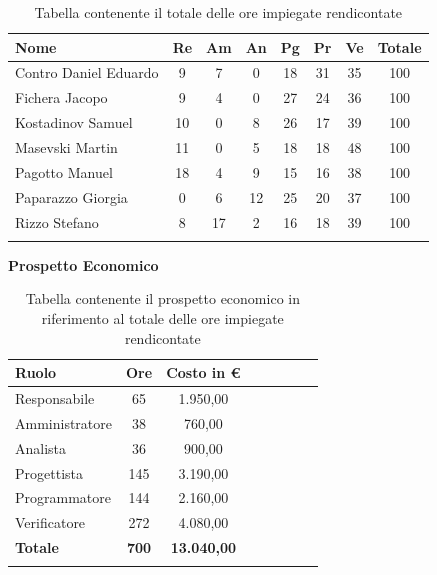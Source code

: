 \documentclass[../piano_di_progetto.tex]{subfiles}
\begin{document}
\begin{center}
	\begin{longtable}{|l|c|c|c|c|c|c|c|}
		\hline
		\rowcolor{lightgray}
		\textbf{Nome} & \textbf{Re} & \textbf{Am} & \textbf{An} & \textbf{Pg}  & \textbf{Pr}   & \textbf{Ve} & \textbf{Totale} \\

		\hline
			Contro Daniel Eduardo & 9 & 7 & 0 & 18 & 31 & 35 & 100 \\
		\hline
			Fichera Jacopo & 9 & 4 & 0 & 27 & 24 & 36 & 100 \\
		\hline
			Kostadinov Samuel & 10 & 0 & 8 & 26 & 17 & 39 & 100 \\		
		\hline
			Masevski Martin & 11 & 0 & 5 & 18 & 18 & 48 & 100 \\
		\hline
			Pagotto Manuel & 18 & 4 & 9 & 15 & 16 & 38 & 100 \\			
		\hline
			Paparazzo Giorgia & 0 & 6 & 12 & 25 & 20 & 37 & 100 \\
		\hline
			Rizzo Stefano & 8 & 17 & 2 & 16 & 18 & 39 & 100 \\
		\hline	
		\rowcolor{white}
		\caption{Tabella contenente il totale delle ore impiegate rendicontate}
	\end{longtable}
\end{center}

\textbf{Prospetto Economico}

\begin{center}
	\begin{longtable}{|l|c|c|c|c|c|c|c|}
		\hline
		\rowcolor{lightgray}
		\textbf{Ruolo} & \textbf{Ore} & \textbf{Costo in €}\\

		\hline
		Responsabile & 65 & 1.950,00 \\
		\hline
		Amministratore & 38 & 760,00 \\
		\hline
		Analista & 36 & 900,00 \\
		\hline
		Progettista & 145 & 3.190,00 \\
		\hline
		Programmatore & 144 & 2.160,00 \\
		\hline
		Verificatore & 272 & 4.080,00 \\
		\hline
		\textbf{Totale} & \textbf{700} & \textbf{13.040,00}\\
		\hline
		\caption{Tabella contenente il prospetto economico in riferimento al totale delle ore impiegate rendicontate}
	\end{longtable}
\end{center}
\end{document}
